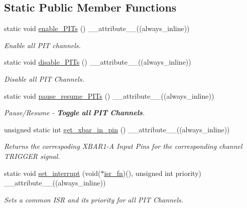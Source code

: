 \subsection*{Static Public Member Functions}
\begin{DoxyCompactItemize}
\item 
static void \hyperlink{classPITController_aa742977692efbc075b52a5dbd6533230}{enable\+\_\+\+P\+I\+Ts} () \+\_\+\+\_\+attribute\+\_\+\+\_\+((always\+\_\+inline))
\begin{DoxyCompactList}\small\item\em Enable all P\+IT channels. \end{DoxyCompactList}\item 
static void \hyperlink{classPITController_a5e1bf9f8053a51c68f0ff2178ab56954}{disable\+\_\+\+P\+I\+Ts} () \+\_\+\+\_\+attribute\+\_\+\+\_\+((always\+\_\+inline))
\begin{DoxyCompactList}\small\item\em Disable all P\+IT Channels. \end{DoxyCompactList}\item 
static void \hyperlink{classPITController_a24b7ea02555967ef945ab87aae338574}{pause\+\_\+resume\+\_\+\+P\+I\+Ts} () \+\_\+\+\_\+attribute\+\_\+\+\_\+((always\+\_\+inline))
\begin{DoxyCompactList}\small\item\em Pause/\+Resume -\/ {\bfseries Toggle} {\bfseries all} {\bfseries P\+IT} {\bfseries Channels}. \end{DoxyCompactList}\item 
unsigned static int \hyperlink{classPITController_a7cb352b2deb5bba48b8e2f0671a66801}{get\+\_\+xbar\+\_\+in\+\_\+pin} () \+\_\+\+\_\+attribute\+\_\+\+\_\+((always\+\_\+inline))
\begin{DoxyCompactList}\small\item\em Returns the correspoding X\+B\+A\+R1-\/A Input Pins for the corresponding channel T\+R\+I\+G\+G\+ER signal. \end{DoxyCompactList}\item 
static void \hyperlink{classPITController_aa94b6dc081d453c8dda54c3ade4b3d94}{set\+\_\+interrupt} (void($\ast$\hyperlink{featureline1_8hpp_a4fc8f622f69a856a51bd3d4b1b42233a}{isr\+\_\+fn})(), unsigned int priority) \+\_\+\+\_\+attribute\+\_\+\+\_\+((always\+\_\+inline))
\begin{DoxyCompactList}\small\item\em Sets a common I\+SR and its priority for all P\+IT Channels. \end{DoxyCompactList}\end{DoxyCompactItemize}
